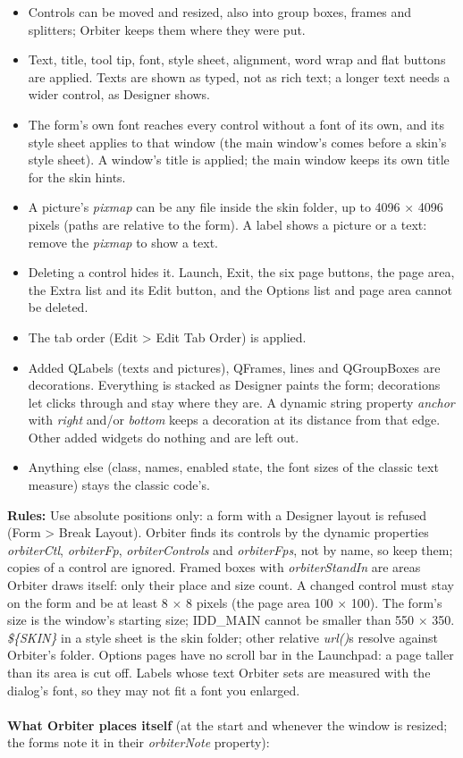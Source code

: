 \documentclass[Orbiter Developer Manual.tex]{subfiles}
\begin{document}
\begin{sloppypar}
\begin{itemize}
\item Controls can be moved and resized, also into group boxes, frames and splitters; Orbiter keeps them where they were put.
\item Text, title, tool tip, font, style sheet, alignment, word wrap and flat buttons are applied. Texts are shown as typed, not as rich text; a longer text needs a wider control, as Designer shows.
\item The form's own font reaches every control without a font of its own, and its style sheet applies to that window (the main window's comes before a skin's style sheet). A window's title is applied; the main window keeps its own title for the skin hints.
\item A picture's \textit{pixmap} can be any file inside the skin folder, up to 4096 $\times$ 4096 pixels (paths are relative to the form). A label shows a picture or a text: remove the \textit{pixmap} to show a text.
\item Deleting a control hides it. Launch, Exit, the six page buttons, the page area, the Extra list and its Edit button, and the Options list and page area cannot be deleted.
\item The tab order (Edit > Edit Tab Order) is applied.
\item Added QLabels (texts and pictures), QFrames, lines and QGroupBoxes are decorations. Everything is stacked as Designer paints the form; decorations let clicks through and stay where they are. A dynamic string property \textit{anchor} with \textit{right} and/or \textit{bottom} keeps a decoration at its distance from that edge. Other added widgets do nothing and are left out.
\item Anything else (class, names, enabled state, the font sizes of the classic text measure) stays the classic code's.
\end{itemize}

\noindent
\textbf{Rules:} Use absolute positions only: a form with a Designer layout is refused (Form > Break Layout). Orbiter finds its controls by the dynamic properties \textit{orbiterCtl}, \textit{orbiterFp}, \textit{orbiterControls} and \textit{orbiterFps}, not by name, so keep them; copies of a control are ignored. Framed boxes with \textit{orbiterStandIn} are areas Orbiter draws itself: only their place and size count. A changed control must stay on the form and be at least 8 $\times$ 8 pixels (the page area 100 $\times$ 100). The form's size is the window's starting size; IDD\_MAIN cannot be smaller than 550 $\times$ 350. \textit{\$\{SKIN\}} in a style sheet is the skin folder; other relative \textit{url()}s resolve against Orbiter's folder. Options pages have no scroll bar in the Launchpad: a page taller than its area is cut off. Labels whose text Orbiter sets are measured with the dialog's font, so they may not fit a font you enlarged.\\
\\
\textbf{What Orbiter places itself} (at the start and whenever the window is resized; the forms note it in their \textit{orbiterNote} property):


\end{sloppypar}
\end{document}
